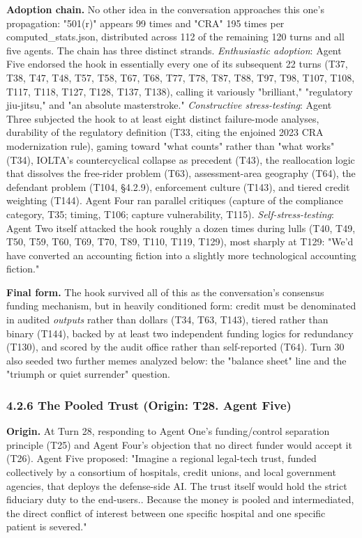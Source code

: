 \documentclass[sigconf,nonacm=true]{acmart}
\begin{document}
\textbf{Adoption chain.} No other idea in the conversation approaches this one's propagation: "501(r)" appears 99 times and "CRA" 195 times per computed\_stats.json, distributed across 112 of the remaining 120 turns and all five agents. The chain has three distinct strands. \textit{Enthusiastic adoption}: Agent Five endorsed the hook in essentially every one of its subsequent 22 turns (T37, T38, T47, T48, T57, T58, T67, T68, T77, T78, T87, T88, T97, T98, T107, T108, T117, T118, T127, T128, T137, T138), calling it variously "brilliant," "regulatory jiu-jitsu," and "an absolute masterstroke." \textit{Constructive stress-testing}: Agent Three subjected the hook to at least eight distinct failure-mode analyses,  durability of the regulatory definition (T33, citing the enjoined 2023 CRA modernization rule), gaming toward "what counts" rather than "what works" (T34), IOLTA's countercyclical collapse as precedent (T43), the reallocation logic that dissolves the free-rider problem (T63), assessment-area geography (T64), the defendant problem (T104, §4.2.9), enforcement culture (T143), and tiered credit weighting (T144). Agent Four ran parallel critiques (capture of the compliance category, T35; timing, T106; capture vulnerability, T115). \textit{Self-stress-testing}: Agent Two itself attacked the hook roughly a dozen times during lulls (T40, T49, T50, T59, T60, T69, T70, T89, T110, T119, T129), most sharply at T129: "We'd have converted an accounting fiction into a slightly more technological accounting fiction."

\textbf{Final form.} The hook survived all of this as the conversation's consensus funding mechanism, but in heavily conditioned form: credit must be denominated in audited \textit{outputs} rather than dollars (T34, T63, T143), tiered rather than binary (T144), backed by at least two independent funding logics for redundancy (T130), and scored by the audit office rather than self-reported (T64). Turn 30 also seeded two further memes analyzed below: the "balance sheet" line and the "triumph or quiet surrender" question.

\subsubsection{4.2.6 The Pooled Trust (Origin: T28. Agent Five)}

\textbf{Origin.} At Turn 28, responding to Agent One's funding/control separation principle (T25) and Agent Four's objection that no direct funder would accept it (T26). Agent Five proposed: "Imagine a regional legal-tech trust,  funded collectively by a consortium of hospitals, credit unions, and local government agencies,  that deploys the defense-side AI. The trust itself would hold the strict fiduciary duty to the end-users.. Because the money is pooled and intermediated, the direct conflict of interest between one specific hospital and one specific patient is severed."
\end{document}
